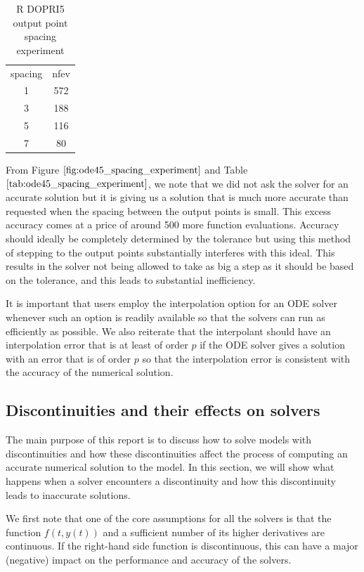 \begin{table}[h]
\caption {R DOPRI5 output point spacing experiment} \label{tab:ode45_spacing_experiment} 
\begin{center}
\begin{tabular}{ c c }
spacing & nfev \\ 
1 & 572 \\
3 & 188 \\
5 & 116 \\
7 & 80 \\
\end{tabular}
\end{center}
\end{table}

From Figure $\ref{fig:ode45_spacing_experiment}$ and Table $\ref{tab:ode45_spacing_experiment}$, we note that we did not ask the solver for an accurate solution but it is giving us a solution that is much more accurate than requested when the spacing between the output points is small. This excess accuracy comes at a price of around 500 more function evaluations. Accuracy should ideally be completely determined by the tolerance but using this method of stepping to the output points substantially interferes with this ideal. This results in the solver not being allowed to take as big a step as it should be based on the tolerance, and this leads to substantial inefficiency. 

It is important that users employ the interpolation option for an ODE solver whenever such an option is readily available so that the solvers can run as efficiently as possible. We also reiterate that the interpolant should have an interpolation error that is at least of order $p$ if the ODE solver gives a solution with an error that is of order $p$ so that the interpolation error is consistent with the accuracy of the numerical solution.

\subsection{Discontinuities and their effects on solvers}
\label{subsection:effect_of_discontinuity}
The main purpose of this report is to discuss how to solve models with discontinuities and how these discontinuities affect the process of computing an accurate numerical solution to the model. In this section, we will show what happens when a solver encounters a discontinuity and how this discontinuity leads to inaccurate solutions.

We first note that one of the core assumptions for all the solvers is that the function $f(t, y(t))$ and a sufficient number of its higher derivatives are continuous. If the right-hand side function is discontinuous, this can have a major (negative) impact on the performance and accuracy of the solvers. 

